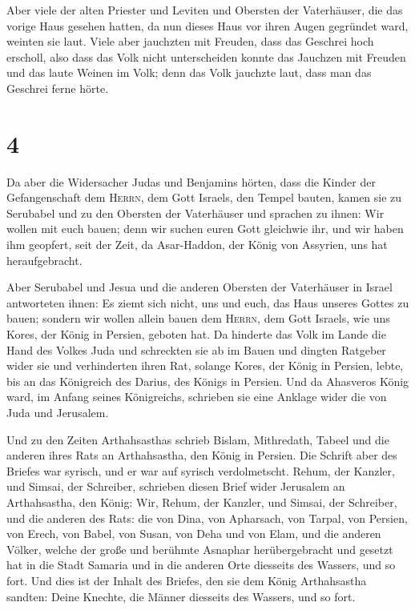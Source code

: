  Aber viele der alten Priester und Leviten und Obersten
der Vaterhäuser, die das vorige Haus gesehen hatten, da nun dieses Haus
vor ihren Augen gegründet ward, weinten sie laut. Viele aber jauchzten
mit Freuden, dass das Geschrei hoch erscholl,  also dass
das Volk nicht unterscheiden konnte das Jauchzen mit Freuden und das
laute Weinen im Volk; denn das Volk jauchzte laut, dass man das Geschrei
ferne hörte.

\hypertarget{section-3}{%
\section{4}\label{section-3}}

 Da aber die Widersacher Judas und Benjamins hörten, dass
die Kinder der Gefangenschaft dem \textsc{Herrn}, dem Gott Israels, den
Tempel bauten,  kamen sie zu Serubabel und zu den Obersten
der Vaterhäuser und sprachen zu ihnen: Wir wollen mit euch bauen; denn
wir suchen euren Gott gleichwie ihr, und wir haben ihm geopfert, seit
der Zeit, da Asar-Haddon, der König von Assyrien, uns hat
heraufgebracht.

 Aber Serubabel und Jesua und die anderen Obersten der
Vaterhäuser in Israel antworteten ihnen: Es ziemt sich nicht, uns und
euch, das Haus unseres Gottes zu bauen; sondern wir wollen allein bauen
dem \textsc{Herrn}, dem Gott Israels, wie uns Kores, der König in
Persien, geboten hat.  Da hinderte das Volk im Lande die
Hand des Volkes Juda und schreckten sie ab im Bauen  und
dingten Ratgeber wider sie und verhinderten ihren Rat, solange Kores,
der König in Persien, lebte, bis an das Königreich des Darius, des
Königs in Persien.  Und da Ahasveros König ward, im Anfang
seines Königreichs, schrieben sie eine Anklage wider die von Juda und
Jerusalem.

 Und zu den Zeiten Arthahsasthas schrieb Bislam,
Mithredath, Tabeel und die anderen ihres Rats an Arthahsastha, den König
in Persien. Die Schrift aber des Briefes war syrisch, und er war auf
syrisch verdolmetscht.  Rehum, der Kanzler, und Simsai,
der Schreiber, schrieben diesen Brief wider Jerusalem an Arthahsastha,
den König:  Wir, Rehum, der Kanzler, und Simsai, der
Schreiber, und die anderen des Rats: die von Dina, von Apharsach, von
Tarpal, von Persien, von Erech, von Babel, von Susan, von Deha und von
Elam,  und die anderen Völker, welche der große und
berühmte Asnaphar herübergebracht und gesetzt hat in die Stadt Samaria
und in die anderen Orte diesseits des Wassers, und so fort.
 Und dies ist der Inhalt des Briefes, den sie dem König
Arthahsastha sandten: Deine Knechte, die Männer diesseits des Wassers,
und so fort.

